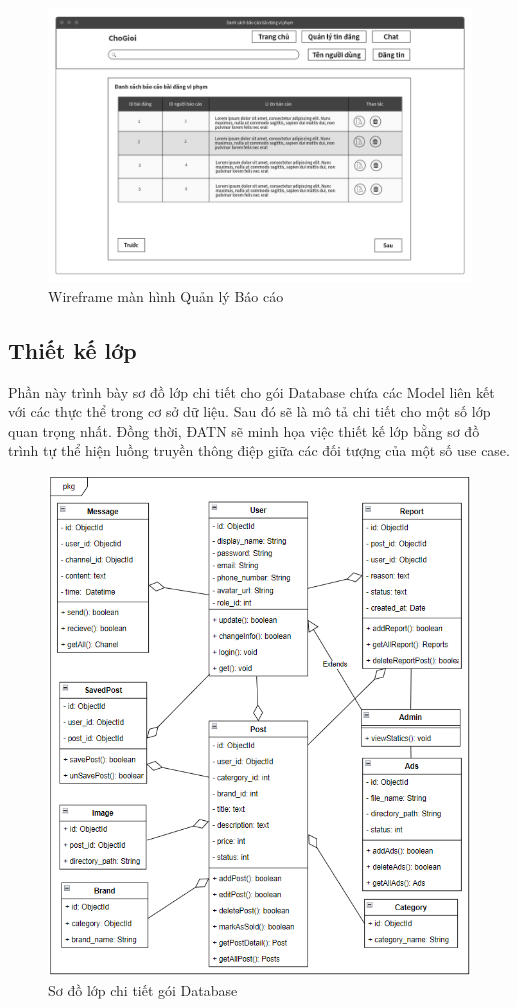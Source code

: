 \documentclass[../DoAn.tex]{subfiles}
\begin{document}
\begin{figure}[H]
    \centering
    \includegraphics[width=0.8\linewidth]{Hinhve/reportMockup.png}
    \caption{Wireframe màn hình Quản lý Báo cáo}
    \label{fig:Fig1}
\end{figure}
\newpage
\subsection{Thiết kế lớp}
Phần này trình bày sơ đồ lớp chi tiết cho gói Database chứa các Model liên kết với các thực thể trong cơ sở dữ liệu. Sau đó sẽ là mô tả chi tiết cho một số lớp quan trọng nhất. Đồng thời, ĐATN sẽ minh họa việc thiết kế lớp bằng sơ đồ trình tự thể hiện luồng truyền thông điệp giữa các đối tượng của một số use case.

\begin{figure}[H]
    \centering
    \includegraphics[width=0.95\linewidth]{Hinhve/thietkelop.png}
    \caption{Sơ đồ lớp chi tiết gói Database}
    \label{fig:Fig1}
\end{figure}
\newpage
\end{document}
